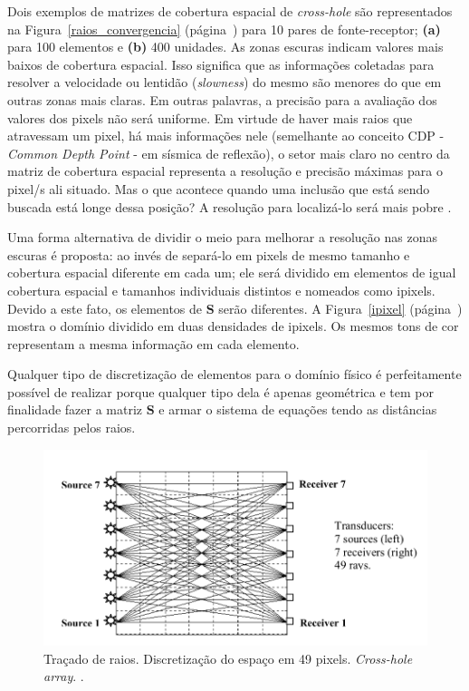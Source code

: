 \documentclass[a4paper, 12 pt]{article} %
\begin{document}
Dois exemplos de matrizes de cobertura espacial de \textit{cross-hole} são representados na Figura~\ref{raios_convergencia} (página~\pageref{raios_convergencia}) para 10 pares de fonte-receptor; \textbf{(a)} para 100 elementos e \textbf{(b)} 400 unidades. As zonas escuras indicam valores mais baixos de cobertura espacial. Isso significa que as informações coletadas para resolver a velocidade ou lentidão (\textit{slowness}) do mesmo são menores do que em outras zonas mais claras. Em outras palavras, a precisão para a avaliação dos valores dos pixels não será uniforme. Em virtude de haver mais raios que atravessam um pixel, há mais informações nele (semelhante ao conceito CDP - \textit{Common Depth Point} - em sísmica de reflexão), o setor mais claro no centro da matriz de cobertura espacial representa a resolução e precisão máximas para o pixel/s ali situado. Mas o que acontece quando uma inclusão que está sendo buscada está longe dessa posição? A resolução para localizá-lo será mais pobre \citep{santamarina1998introduction}.

Uma forma alternativa de dividir o meio para melhorar a resolução nas zonas escuras é proposta: ao invés de separá-lo em pixels de mesmo tamanho e cobertura espacial diferente em cada um; ele será dividido em elementos de igual cobertura espacial e tamanhos individuais distintos e nomeados como ipixels. Devido a este fato, os elementos de $\textbf{S}$ serão diferentes. A Figura~\ref{ipixel} (página~\pageref{ipixel}) mostra o domínio dividido em duas densidades de ipixels. Os mesmos tons de cor representam a mesma informação em cada elemento.

Qualquer tipo de discretização de elementos para o domínio físico é perfeitamente possível de realizar porque qualquer tipo dela é apenas geométrica e tem por finalidade fazer a matriz $\textbf{S}$ e armar o sistema de equações tendo as distâncias percorridas pelos raios.

\begin{figure}[!hbtp]
	\begin{center}
		\includegraphics[scale=0.50]{Figuras/raios.png}
	\end{center}
	\caption{Traçado de raios. Discretização do espaço em 49 pixels. \textit{Cross-hole array}. \cite{RBGf1495}.}
	\label{raios}
\end{figure}
\end{document}
